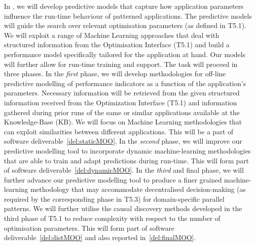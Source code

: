\begin{Workpackage}{\thewpno}
\begin{Task}
\end{Task}

\begin{Task}
\TaskResults{%
\ref{del:staticMOO}
\ref{del:dynamicMOO}
\ref{del:distMOO}
\ref{del:finalMOO}
}
\TaskHeader{}

In \theTask, we will develop predictive models that capture how application 
parameters influence the run-time behaviour of patterned applications. The predictive 
models will guide the search over relevant optimisation parameters (as defined in T5.1). 
We will exploit a range of Machine Learning approaches that deal with structured 
information from the Optimisation Interface (T5.1) and build a performance model 
specifically tailored for the application at hand. Our models will further allow 
for run-time training and support. The task will proceed in three phases. In the 
\emph{first} phase, we will develop methodologies for off-line predictive 
modelling of performance indicators as a function of the application's parameters. 
Necessary information will be retrieved from the given structured information 
received from the Optimization Interface (T5.1) and information gathered during 
prior runs of the same or similar applications available at the Knowledge-Base (KB). We will focus
 on Machine Learning methodologies that can exploit similarities between different applications. This will be %
a part of software deliverable~\ref{del:staticMOO}. In the \emph{second} phase, we will improve our 
predictive modelling tool to incorporate dynamic machine-learning methodologies that 
are able to train and adapt predictions during run-time. This will form part of software deliverable~\ref{del:dynamicMOO}.
\taskbreak
In the \emph{third} and final phase, we will further advance our predictive 
modelling tool to produce a finer grained machine-learning methodology that may accommodate 
decentralised decision-making (as required by the corresponding phase in T5.3) for 
domain-specific parallel patterns. We will further utilise the causal discovery methods developed in the third phase of T5.1 to reduce complexity with respect to the number of optimisation parameters. This will form part of software deliverable~\ref{del:distMOO} and also reported in~\ref{del:finalMOO}.




\end{Task}
\end{Workpackage}
